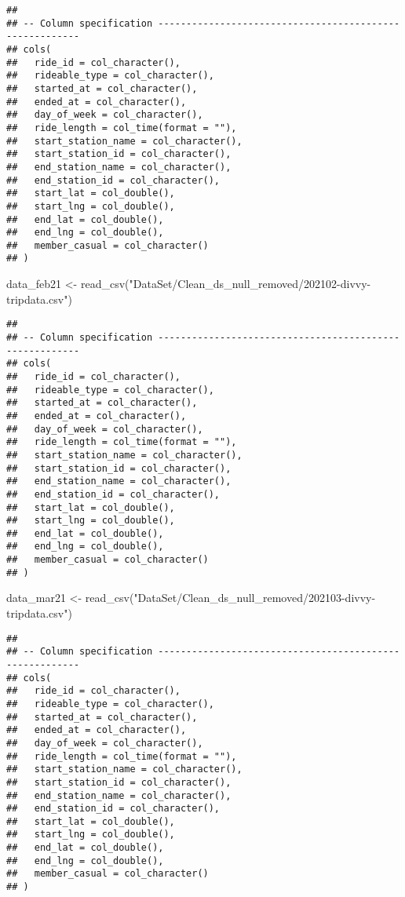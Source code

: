 \documentclass[
]{article}
\newenvironment{Shaded}{\begin{snugshade}}{\end{snugshade}}
\newcommand{\FunctionTok}[1]{\textcolor[rgb]{0.00,0.00,0.00}{#1}}
\newcommand{\NormalTok}[1]{#1}
\newcommand{\OtherTok}[1]{\textcolor[rgb]{0.56,0.35,0.01}{#1}}
\newcommand{\StringTok}[1]{\textcolor[rgb]{0.31,0.60,0.02}{#1}}
\begin{document}
\begin{verbatim}
## 
## -- Column specification --------------------------------------------------------
## cols(
##   ride_id = col_character(),
##   rideable_type = col_character(),
##   started_at = col_character(),
##   ended_at = col_character(),
##   day_of_week = col_character(),
##   ride_length = col_time(format = ""),
##   start_station_name = col_character(),
##   start_station_id = col_character(),
##   end_station_name = col_character(),
##   end_station_id = col_character(),
##   start_lat = col_double(),
##   start_lng = col_double(),
##   end_lat = col_double(),
##   end_lng = col_double(),
##   member_casual = col_character()
## )
\end{verbatim}

\begin{Shaded}
\begin{Highlighting}[]
\NormalTok{data\_feb21 }\OtherTok{\textless{}{-}} \FunctionTok{read\_csv}\NormalTok{(}\StringTok{"DataSet/Clean\_ds\_null\_removed/202102{-}divvy{-}tripdata.csv"}\NormalTok{)}
\end{Highlighting}
\end{Shaded}

\begin{verbatim}
## 
## -- Column specification --------------------------------------------------------
## cols(
##   ride_id = col_character(),
##   rideable_type = col_character(),
##   started_at = col_character(),
##   ended_at = col_character(),
##   day_of_week = col_character(),
##   ride_length = col_time(format = ""),
##   start_station_name = col_character(),
##   start_station_id = col_character(),
##   end_station_name = col_character(),
##   end_station_id = col_character(),
##   start_lat = col_double(),
##   start_lng = col_double(),
##   end_lat = col_double(),
##   end_lng = col_double(),
##   member_casual = col_character()
## )
\end{verbatim}

\begin{Shaded}
\begin{Highlighting}[]
\NormalTok{data\_mar21 }\OtherTok{\textless{}{-}} \FunctionTok{read\_csv}\NormalTok{(}\StringTok{"DataSet/Clean\_ds\_null\_removed/202103{-}divvy{-}tripdata.csv"}\NormalTok{)}
\end{Highlighting}
\end{Shaded}

\begin{verbatim}
## 
## -- Column specification --------------------------------------------------------
## cols(
##   ride_id = col_character(),
##   rideable_type = col_character(),
##   started_at = col_character(),
##   ended_at = col_character(),
##   day_of_week = col_character(),
##   ride_length = col_time(format = ""),
##   start_station_name = col_character(),
##   start_station_id = col_character(),
##   end_station_name = col_character(),
##   end_station_id = col_character(),
##   start_lat = col_double(),
##   start_lng = col_double(),
##   end_lat = col_double(),
##   end_lng = col_double(),
##   member_casual = col_character()
## )
\end{verbatim}
\end{document}
